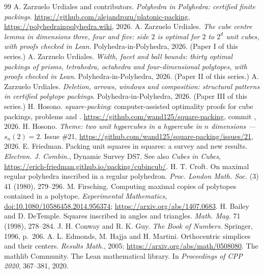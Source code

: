 \documentclass[11pt,a4paper]{article}
\begin{document}
\begin{thebibliography}{99}
 A. Zarzuelo Urdiales and contributors. \emph{Polyhedra in Polyhedra: certified finite packings}. \url{https://github.com/alejandrozu/platonic-packing}, \url{https://polyhedrainpolyhedra.wiki}, 2026.
 A. Zarzuelo Urdiales. \emph{The cube centre lemma in dimensions three, four and five: side $2$ is optimal for $2$ to $2^d$ unit cubes, with proofs checked in Lean}. Polyhedra-in-Polyhedra, 2026. (Paper I of this series.)
 A. Zarzuelo Urdiales. \emph{Width, facet and ball bounds: thirty optimal packings of prisms, tetrahedra, octahedra and four-dimensional polytopes, with proofs checked in Lean}. Polyhedra-in-Polyhedra, 2026. (Paper II of this series.)
 A. Zarzuelo Urdiales. \emph{Deletion, arrows, windows and composition: structural patterns in certified polytope packings}. Polyhedra-in-Polyhedra, 2026. (Paper III of this series.)
 H. Hosono. \emph{square-packing}: computer-assisted optimality proofs for cube packings, problems  and . \url{https://github.com/wand125/square-packing}, commit , 2026.
 H. Hosono. \emph{Theme: two unit hypercubes in a hypercube in $n$ dimensions --- $s_n(2)=2$}. Issue \#21, \url{https://github.com/wand125/square-packing/issues/21}, 2026.
 E. Friedman. Packing unit squares in squares: a survey and new results. \emph{Electron. J. Combin.}, Dynamic Survey DS7. See also \emph{Cubes in Cubes}, \url{https://erich-friedman.github.io/packing/cubincub/}.
 H. T. Croft. On maximal regular polyhedra inscribed in a regular polyhedron. \emph{Proc. London Math. Soc.} (3) 41 (1980), 279--296.
 M. Firsching. Computing maximal copies of polytopes contained in a polytope. \emph{Experimental Mathematics}, \href{https://doi.org/10.1080/10586458.2014.956374}{doi:10.1080/10586458.2014.956374}; \url{https://arxiv.org/abs/1407.0683}.
 H. Bailey and D. DeTemple. Squares inscribed in angles and triangles. \emph{Math. Mag.} 71 (1998), 278--284.
 J. H. Conway and R. K. Guy. \emph{The Book of Numbers}. Springer, 1996, p.~206.
 A. L. Edmonds, M. Hajja and H. Martini. Orthocentric simplices and their centers. \emph{Results Math.}, 2005; \url{https://arxiv.org/abs/math/0508080}.
 The mathlib Community. The Lean mathematical library. In \emph{Proceedings of CPP 2020}, 367--381, 2020.
\end{thebibliography}
\end{document}
